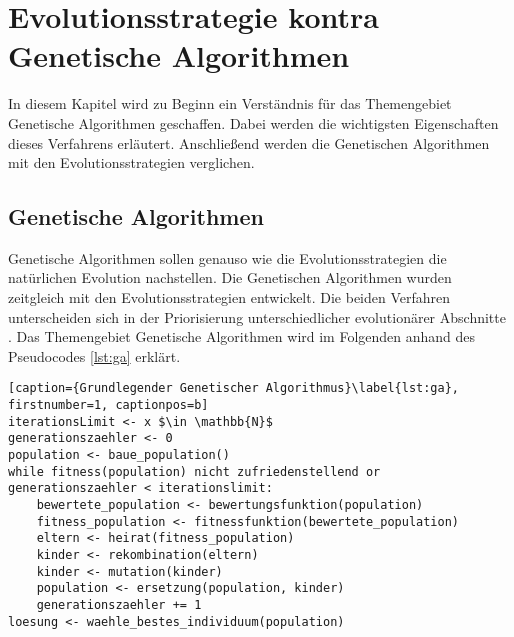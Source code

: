 \section{Evolutionsstrategie kontra Genetische Algorithmen}
In diesem Kapitel wird zu Beginn ein Verständnis für das Themengebiet Genetische Algorithmen geschaffen. Dabei werden die wichtigsten Eigenschaften dieses Verfahrens erläutert. Anschließend werden die Genetischen Algorithmen mit den Evolutionsstrategien verglichen.


\subsection{Genetische Algorithmen}
Genetische Algorithmen sollen genauso wie die Evolutionsstrategien die natürlichen Evolution nachstellen.
Die Genetischen Algorithmen wurden zeitgleich mit den Evolutionsstrategien entwickelt. Die beiden Verfahren unterscheiden sich in der Priorisierung unterschiedlicher evolutionärer Abschnitte \cite[S. 185]{schoeneburg}.
Das Themengebiet Genetische Algorithmen wird im Folgenden anhand des Pseudocodes \ref{lst:ga} erklärt.

\begin{lstlisting}[caption={Grundlegender Genetischer Algorithmus}\label{lst:ga}, firstnumber=1, captionpos=b]
iterationsLimit <- x $\in \mathbb{N}$
generationszaehler <- 0
population <- baue_population()
while fitness(population) nicht zufriedenstellend or generationszaehler < iterationslimit:
	bewertete_population <- bewertungsfunktion(population)
	fitness_population <- fitnessfunktion(bewertete_population)
	eltern <- heirat(fitness_population)
	kinder <- rekombination(eltern)
	kinder <- mutation(kinder)
	population <- ersetzung(population, kinder)
	generationszaehler += 1
loesung <- waehle_bestes_individuum(population)
\end{lstlisting}

